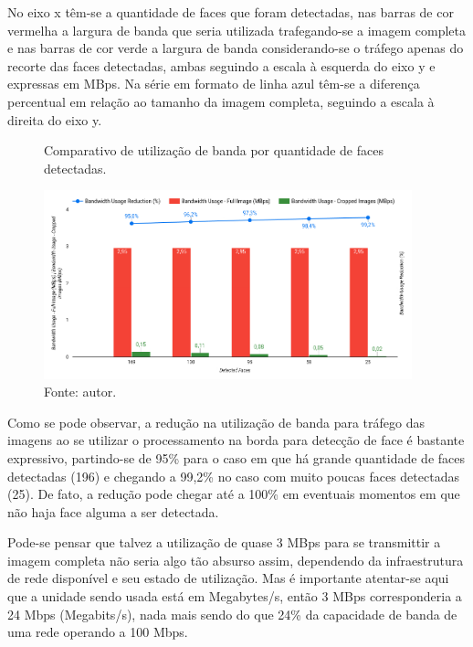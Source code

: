 No eixo x têm-se a quantidade de faces que foram detectadas, nas barras de cor vermelha a largura de banda que seria utilizada trafegando-se a imagem completa e nas barras de cor verde a largura de banda considerando-se o tráfego apenas do recorte das faces detectadas, ambas seguindo a escala à esquerda do eixo y e expressas em MBps. Na série em formato de linha azul têm-se a diferença percentual em relação ao tamanho da imagem completa, seguindo a escala à direita do eixo y.

\begin{figure}
    \centering
    \caption[Comparativo de utilização de banda por quantidade de faces detectadas.]{Comparativo de utilização de banda por quantidade de faces detectadas.}
    \includegraphics[width=0.95\textwidth]{Cap4_Experimentos_Realizados/Figures/cena1_comparativo_utilizacao_banda.jpg}
    \caption*{Fonte: autor.}
    \label{fig:cena1_comparativo_utilizacao_banda}
\end{figure}

Como se pode observar, a redução na utilização de banda para tráfego das imagens ao se utilizar o processamento na borda para detecção de face é bastante expressivo, partindo-se de 95\% para o caso em que há grande quantidade de faces detectadas (196) e chegando a 99,2\% no caso com muito poucas faces detectadas (25). De fato, a redução pode chegar até a 100\% em eventuais momentos em que não haja face alguma a ser detectada.

Pode-se pensar que talvez a utilização de quase 3 MBps para se transmittir a imagem completa não seria algo tão absurso assim, dependendo da infraestrutura de rede disponível e seu estado de utilização. Mas é importante atentar-se aqui que a unidade sendo usada está em Megabytes/s, então 3 MBps corresponderia a 24 Mbps (Megabits/s), nada mais sendo do que 24\% da capacidade de banda de uma rede operando a 100 Mbps.

